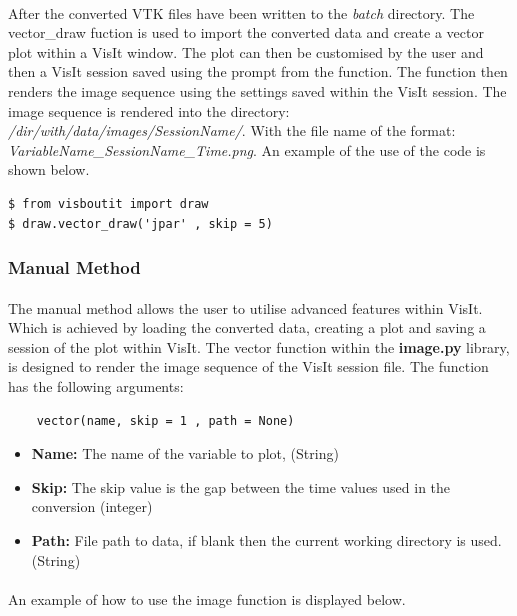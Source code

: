 \documentclass[12pt,a4paper]{article}
\begin{document}
\paragraph{}
After the converted VTK files have been written to the \textit{batch} directory. The vector\_draw fuction is used to import the converted data and create a vector plot within a VisIt window. The plot can then be customised by the user and then a VisIt session saved using the prompt from the function. The function then renders the image sequence using the settings saved within the VisIt session. The image sequence is rendered into the directory: \textit{/dir/with/data/images/SessionName/}. With the file name of the format: \textit{VariableName\_SessionName\_Time.png}. An example of the use of the code is shown below.

\begin{verbatim}
$ from visboutit import draw
$ draw.vector_draw('jpar' , skip = 5)
\end{verbatim}

\subsubsection{Manual Method}
\paragraph{}
The manual method allows the user to utilise advanced features within VisIt. Which is achieved by loading the converted data, creating a plot and saving a session of the plot within VisIt. The vector function within the \textbf{image.py} library, is designed to render the image sequence of the VisIt session file. The function has the following arguments:

\begin{verbatim}
	vector(name, skip = 1 , path = None)
\end{verbatim}

\begin{itemize}
	\item{\textbf{Name:} The name of the variable to plot, (String)}
	\item{\textbf{Skip:} The skip value is the gap between the time values used in the conversion (integer)}
	\item{\textbf{Path:} File path to data, if blank then the current working directory is used. (String)}
\end{itemize}

\paragraph{} An example of how to use the image function is displayed below.
\end{document}
